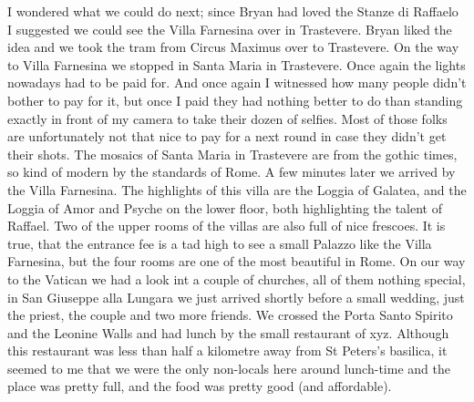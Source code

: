  I wondered what we could do next; since Bryan had loved the Stanze di Raffaelo I suggested we could see the Villa Farnesina over in Trastevere. Bryan liked the idea and we took the tram from Circus Maximus over to Trastevere. On the way to Villa Farnesina we stopped in Santa Maria in Trastevere. Once again the lights nowadays had to be paid for. And once again I witnessed how many people didn't bother to pay for it, but once I paid they had nothing better to do than standing exactly in front of my camera to take their dozen of selfies. Most of those folks are unfortunately not that nice to pay for a next round in case they didn't get their shots. The mosaics of Santa Maria in Trastevere are from the gothic times, so kind of modern by the standards of Rome. A few minutes later we arrived by the Villa Farnesina. The highlights of this villa are the Loggia of Galatea, and the Loggia of Amor and Psyche on the lower floor, both highlighting the talent of Raffael. Two of the upper rooms of the villas are also full of nice frescoes. It is true, that the entrance fee is a tad high to see a small Palazzo like the Villa Farnesina, but the four rooms are one of the most beautiful in Rome. On our way to the Vatican we had a look int a couple of churches, all of them nothing special, in San Giuseppe alla Lungara we just arrived shortly before a small wedding, just the priest, the couple and two more friends. We crossed the Porta Santo Spirito and the Leonine Walls and had lunch by the small restaurant of xyz. Although this restaurant was less than half a kilometre away from St Peters's basilica, it seemed to me that we were the only non-locals here around lunch-time and the place was pretty full, and the food was pretty good (and affordable).\\
